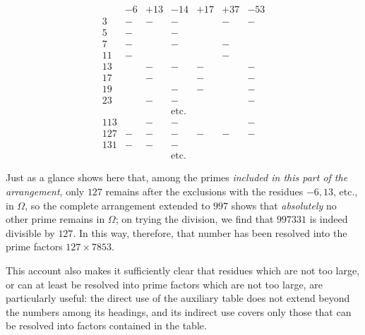 \[\renewcommand{\arraystretch}{1.05}\begin{array}{|r|c|c|c|c|c|c|}&-6&+13&-14&+17&+37&-53\\\hline 3&-&-&-&&-&-\\5&-&&-&&&\\7&-&&-&&-&\\11&-&&&&-&\\13&&-&-&-&&-\\17&&-&&-&&-\\19&&&-&-&&-\\23&&-&-&&&-\\&&&\text{etc.}&&&\\113&&-&-&&&-\\127&-&-&-&-&-&-\\131&-&-&-&&&\\&&&\text{etc.}&&&\end{array}\]

Just as a glance shows here that, among the primes \textit{included in this part of the arrangement}, only \(127\) remains after the exclusions with the residues \(-6,\allowbreak 13\), etc., in \(\Omega\), so the complete arrangement extended to \(997\) shows that \textit{absolutely} no other prime remains in \(\Omega\); on trying the division, we find that \(997331\) is indeed divisible by \(127\). In this way, therefore, that number has been resolved into the prime factors \(127\times7853\).

This account also makes it sufficiently clear that residues which are not too large, or can at least be resolved into prime factors which are not too large, are particularly useful: the direct use of the auxiliary table does not extend beyond the numbers among its headings, and its indirect use covers only those that can be resolved into factors contained in the table.

